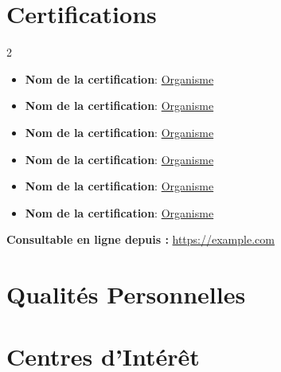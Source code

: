 \documentclass[letterpaper,10pt]{article}
\begin{document}

\section{Certifications}
\begin{multicols}{2}
\begin{itemize}[leftmargin=*, noitemsep]
  \item \textbf{Nom de la certification}: \href{https://example.com}{Organisme}
  \item \textbf{Nom de la certification}: \href{https://example.com}{Organisme}
  \item \textbf{Nom de la certification}: \href{https://example.com}{Organisme}

  \columnbreak
  \item \textbf{Nom de la certification}: \href{https://example.com}{Organisme}
  \item \textbf{Nom de la certification}: \href{https://example.com}{Organisme}
  \item \textbf{Nom de la certification}: \href{https://example.com}{Organisme}
\end{itemize}
\end{multicols}
\newline
\textbf{Consultable en ligne depuis : } \url{https://example.com}




\section{Qualités Personnelles}


\section{Centres d'Intérêt}
\end{document}
